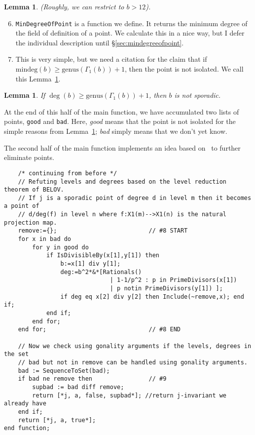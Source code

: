 \documentclass[11pt,reqno]{amsart}
\theoremstyle{plain}
\newtheorem{lemma}[theorem]{Lemma}
\theoremstyle{definition}
\begin{document}
\begin{lemma}\label{lemma:b_geq_12}
  (Roughly, we can restrict to $b > 12$).
\end{lemma}

\begin{enumerate}\setcounter{enumi}{5}
  \item\label{item:min_degree} \texttt{MinDegreeOfPoint} is a function we
  define. It returns the minimum degree of the field of definition of a point.
  We calculate this in a nice way, but I defer the individual description until
  \S\ref{sec:mindegreeofpoint}.

  \item\label{item:min_deg_genus} This is very simple, but we need a citation for the claim that if
  $\mathrm{mindeg}(b) \geq \mathrm{genus}(\Gamma_1(b)) + 1$, then the point is
  not isolated. We call this Lemma~\ref{lemma:min_deg_genus}.
\end{enumerate}


\begin{lemma}\label{lemma:min_deg_genus}
  If $\deg(b) \geq \mathrm{genus}(\Gamma_1(b)) + 1$, then $b$ is not sporadic.
\end{lemma}


At the end of this half of the main function, we have accumulated two lists of
points, \texttt{good} and \texttt{bad}. Here, \emph{good} means that the point
is not isolated for the simple reasons from Lemma~\ref{lemma:min_deg_genus};
\emph{bad} simply means that we don't yet know.

The second half of the main function implements an idea based
on~\cite{Bourdon2019} to further eliminate points.


\begin{verbatim}
    /* continuing from before */
    // Refuting levels and degrees based on the level reduction theorem of BELOV.
    // If j is a sporadic point of degree d in level m then it becomes a point of
    // d/deg(f) in level n where f:X1(m)-->X1(n) is the natural projection map.
    remove:={};                          // #8 START
    for x in bad do
        for y in good do
            if IsDivisibleBy(x[1],y[1]) then
                b:=x[1] div y[1];
                deg:=b^2*&*[Rationals()
                              | 1-1/p^2 : p in PrimeDivisors(x[1])
                              | p notin PrimeDivisors(y[1]) ];
                if deg eq x[2] div y[2] then Include(~remove,x); end if;
            end if;
        end for;
    end for;                             // #8 END

    // Now we check using gonality arguments if the levels, degrees in the set
    // bad but not in remove can be handled using gonality arguments.
    bad := SequenceToSet(bad);
    if bad ne remove then                // #9
        supbad := bad diff remove;
        return [*j, a, false, supbad*]; //return j-invariant we already have
    end if;
    return [*j, a, true*];
end function;
\end{verbatim}
\end{document}
